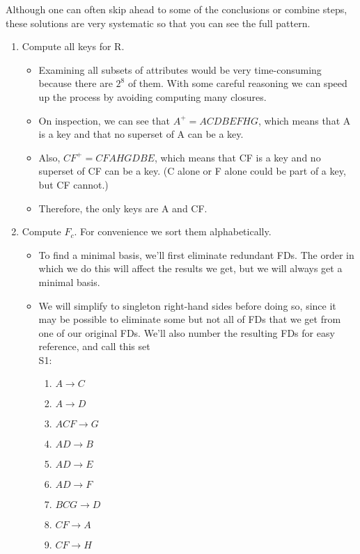 \documentclass{homework}
\begin{document}
\question
Although one can often skip ahead to some of the conclusions or combine steps, these solutions are very systematic so that you can see the full pattern.
\begin{enumerate}[label=(\Alph*)]
    \item Compute all keys for R.
    \begin{itemize}
        \item Examining all subsets of attributes would be very time-consuming because there are $2^8$ of them. With some careful reasoning we can speed up the process by avoiding computing many closures.
        \item On inspection, we can see that $A^+=ACDBEFHG$, which means that A is a key and that no superset of A can be a key.
        \item Also, $CF^+=CFAHGDBE$, which means that CF is a key and no superset of CF can be a key. (C alone or F alone could be part of a key, but CF cannot.)
        \item Therefore, the only keys are A and CF.
    \end{itemize}
    \item Compute $F_c$. For convenience we sort them alphabetically.
    \begin{itemize}
        \item To find a minimal basis, we'll first eliminate redundant FDs. The order in which we do this will affect the results we get, but we will always get a minimal basis.
        \item We will simplify to singleton right-hand sides before doing so, since it may be possible to eliminate some but not all of FDs that we get from one of our original FDs. We'll also number the resulting FDs for easy reference, and call this set \\S1:
        \begin{enumerate}[label=\arabic*]
            \item $A\rightarrow C$
            \item $A\rightarrow D$
            \item $ACF\rightarrow G$
            \item $AD\rightarrow B$
            \item $AD\rightarrow E$
            \item $AD\rightarrow F$
            \item $BCG\rightarrow D$
            \item $CF\rightarrow A$
            \item $CF\rightarrow H$

\end{enumerate}
\end{itemize}
\end{enumerate}
\end{document}
